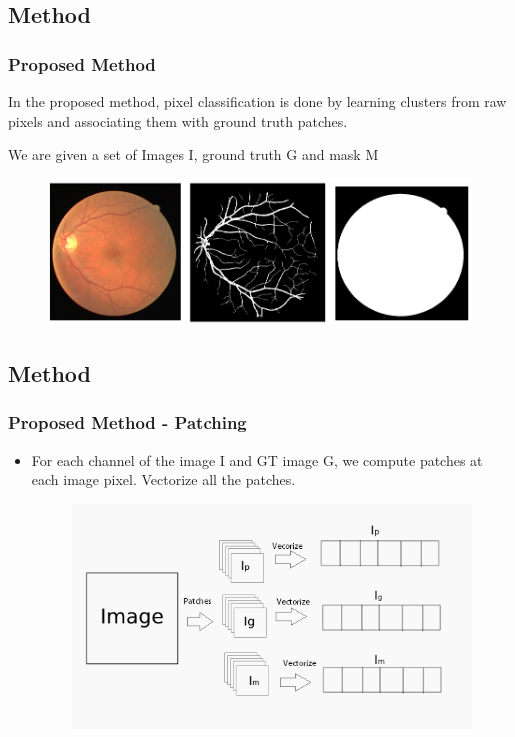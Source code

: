 \documentclass{beamer}
\begin{document}
\subsection{Method}
\begin{frame}
\frametitle{Proposed Method}
In the proposed method, pixel classification is done by learning clusters from raw pixels and associating them with ground truth patches.

We are given a set of Images I, ground truth G and mask M
\begin{figure}
\includegraphics[width=1.0\linewidth]{Images/Method1.png}
\end{figure}
\end{frame}

\subsection{Method}
\begin{frame}
\frametitle{Proposed Method - Patching}
\begin{itemize}
\item For each channel of the image I and GT image G, we compute patches at each image pixel. Vectorize all the patches.
\begin{figure}
\includegraphics[width=0.8\linewidth]{Images/Method2.png}

\end{figure}


\end{itemize}

\end{frame}
\end{document}
